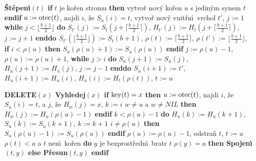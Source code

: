 {\bf \v St\v epen\'\i$(t)$\newline 
if} $t$ je ko\v ren stromu {\bf then}\newline 
\phantom{---}vytvo\v r nov\'y ko\v ren $u$ s jedin\'ym synem $t$\newline 
{\bf endif}\newline 
$u:=\operatorname{otec}(t)$, najdi $i$, \v ze $S_u(i)=t$,\newline 
vytvo\v r nov\'y vnit\v rn\'\i\ vrchol $t'$, $j:=1$\newline 
{\bf while} $j<\lfloor\frac {b+1}2\rfloor$ {\bf do}\newline 
\phantom{---}$S_{t'}(j):=S_t(j+\lceil\frac {b+1}2\rceil )$, $H_{t'}(j):=H_t(j+\lceil\frac {b+1}2\rceil)$, $j:=j+1$\newline 
{\bf enddo\newline 
$S_{t'}(\lfloor\frac {b+1}2\rfloor ):=S_t(b+1)$}, $\rho (t):=\lceil\frac {
b+1}2\rceil$, $\rho (t'):=\lfloor\frac {b+1}2\rfloor$,\newline 
{\bf if} $i<\rho (u)$ {\bf then} $S_u(\rho (u)+1):=S_u(\rho (u))$ {\bf endif\newline}
$j:=\rho (u)-1$, $\rho (u):=\rho (u)+1$,\newline 
{\bf while} $j>i$ {\bf do}\newline 
\phantom{---}$S_u(j+1):=S_u(j)$, $H_u(j+1):=H_u(j)$, $j:=j-1$\newline 
{\bf enddo\newline 
$S_u(i+1):=t'$}, $H_u(i+1):=H_u(i)$, $H_u(i):=H_t(\rho (t))$, 
$t:=u$
\medskip

{\bf DELETE$(x)$\newline 
Vyhledej$(x)$\newline 
if} $\operatorname{key}(t)=x$ {\bf then}\newline 
\phantom{---}$u:=\operatorname{otec}(t)$, najdi $i$, \v ze $S_u(i)=t$, a $j$, \v ze $H_w(j)=x$, $k:=i$\newline 
\phantom{---}{\bf if} $w\ne u$ a $w\ne NIL$ {\bf then} $H_w(j):=H_u(\rho (u)-1)$ {\bf endif}\newline 
\phantom{---}{\bf while} $k<\rho (u)-1$ {\bf do}\newline 
\phantom{------}$H_u(k):=H_u(k+1)$, $S_u(k):=S_u(k+1)$, $k:=k+1$ \newline 
\phantom{---}{\bf enddo}\newline 
\phantom{---}{\bf if} $i\ne\rho(u)$ {\bf then} $S_u(\rho (u)-1):=S_u(\rho (u))$ {\bf endif}\newline
\phantom{---}$\rho (u):=\rho (u)-1$, odstra\v n $t$, $t:=u$ \newline 
\phantom{---}{\bf while} $\rho (t)<a$ a $t$ nen\'\i\ ko\v ren {\bf do}\newline 
\phantom{------}$y$ je bezprost\v redn\'\i\ bratr $t$\newline 
\phantom{------}{\bf if} $\rho (y)=a$ {\bf then Spojen\'\i$(t,y)$ else P\v resun$
(t,y)$ endif}\newline 
\phantom{---}{\bf enddo\newline 
endif}
\medskip

